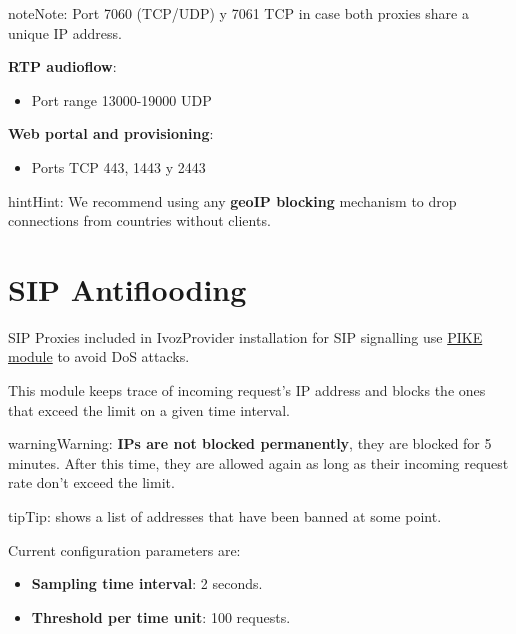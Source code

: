 \documentclass[letterpaper,10pt,english]{sphinxmanual}
\begin{document}
\begin{notice}{note}{Note:}
Port 7060 (TCP/UDP) y 7061 TCP in case both proxies share a unique IP address.
\end{notice}

\textbf{RTP audioflow}:
\begin{itemize}
\item {} 
Port range 13000-19000 UDP

\end{itemize}

\textbf{Web portal and provisioning}:
\begin{itemize}
\item {} 
Ports TCP 443, 1443 y 2443

\end{itemize}

\begin{notice}{hint}{Hint:}
We recommend using any \textbf{geoIP blocking} mechanism to drop connections from
countries without clients.
\end{notice}


\section{SIP Antiflooding}
\label{security_and_maintenance/security/antiflooding::doc}\label{security_and_maintenance/security/antiflooding:sip-antiflooding}
SIP Proxies included in IvozProvider installation for SIP signalling use
\href{http://kamailio.org/docs/modules/5.1.x/modules/pike.html}{PIKE module} to avoid DoS attacks.

This module keeps trace of incoming request's IP address and blocks the ones that exceed the limit on a given time
interval.

\begin{notice}{warning}{Warning:}
\textbf{IPs are not blocked permanently}, they are blocked for 5 minutes. After this time, they are allowed again
as long as their incoming request rate don't exceed the limit.
\end{notice}

\begin{notice}{tip}{Tip:}
{\hyperref[administration_portal/platform/antiflood_banned_ips:antiflood\string-banned\string-ips]{}} shows a list of addresses that have been banned at some point.
\end{notice}

Current configuration parameters are:
\begin{itemize}
\item {} 
\textbf{Sampling time interval}: 2 seconds.

\item {} 
\textbf{Threshold per time unit}: 100 requests.

\end{itemize}
\end{document}
